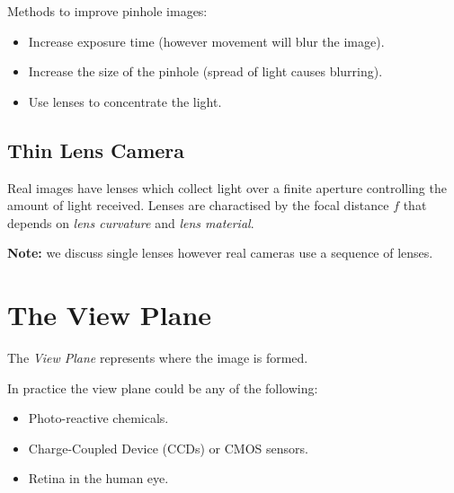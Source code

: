 \documentclass{article}
\begin{document}
Methods to improve pinhole images:
\begin{itemize}
	\item Increase exposure time (however movement will blur the image).
	\item Increase the size of the pinhole (spread of light causes blurring).
	\item Use lenses to concentrate the light.
\end{itemize}

\subsection{Thin Lens Camera}
Real images have lenses which collect light over a finite aperture controlling the amount of light received.
Lenses are charactised by the focal distance $f$ that depends on {\it lens curvature} and {\it lens material}.

{\bf Note:} we discuss single lenses however real cameras use a sequence of lenses.

\section{The View Plane}
The {\it View Plane} represents where the image is formed.

In practice the view plane could be any of the following:
\begin{itemize}
	\item Photo-reactive chemicals.
	\item Charge-Coupled Device (CCDs) or CMOS sensors.
	\item Retina in the human eye.
\end{itemize}
\end{document}

